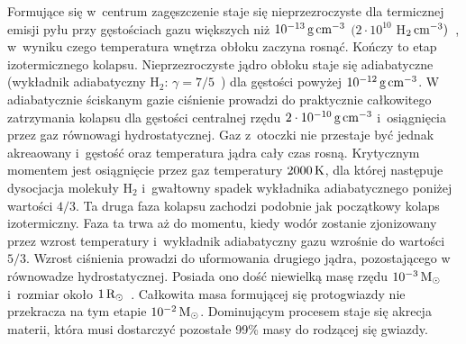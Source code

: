 \par Formujące się w~centrum zagęszczenie staje się nieprzezroczyste dla
termicznej emisji pyłu przy gęstościach gazu większych niż $10^{-13}\hbox{$\thinspace\textrm{g}$}\hbox{$\thinspace\textrm{cm}$}^{-3}$
$(2\cdot10^{10}$ H$_2\hbox{$\thinspace\textrm{cm}$}^{-3})$~\cite{L69}, w~wyniku czego temperatura wnętrza
obłoku zaczyna rosnąć. Kończy to etap izotermicznego kolapsu. Nieprzezroczyste
jądro obłoku staje się adiabatyczne (wykładnik adiabatyczny H$_2$: $\gamma =
7/5$~\cite{L69}) dla gęstości powyżej $10^{-12}\hbox{$\thinspace\textrm{g}$}\hbox{$\thinspace\textrm{cm}$}^{-3}$. W adiabatycznie
ściskanym gazie ciśnienie prowadzi do praktycznie
całkowitego zatrzymania kolapsu dla gęstości centralnej rzędu $2\cdot
10^{-10}\hbox{$\thinspace\textrm{g}$}\hbox{$\thinspace\textrm{cm}$}^{-3}$ i~osiągnięcia przez gaz równowagi hydrostatycznej. Gaz
z~otoczki nie przestaje być jednak akreaowany i~gęstość oraz temperatura jądra
cały czas rosną. Krytycznym momentem jest osiągnięcie przez gaz temperatury
$2000\hbox{$\thinspace\textrm{K}$}$, dla której następuje dysocjacja molekuły H$_2$ i~gwałtowny spadek
wykładnika adiabatycznego poniżej wartości $4/3$. Ta druga faza kolapsu zachodzi
podobnie jak początkowy kolaps izotermiczny. Faza ta trwa aż do momentu, kiedy
wodór zostanie zjonizowany przez wzrost temperatury i~wykładnik adiabatyczny
gazu wzrośnie do wartości $5/3$.  Wzrost ciśnienia prowadzi do uformowania
drugiego jądra, pozostającego w równowadze hydrostatycznej. Posiada ono dość
niewielką masę rzędu $10^{-3}\hbox{$\mathrm{\thinspace M_{\odot}}$}$ i~rozmiar około $1\hbox{$\mathrm{\thinspace R_{\odot}}$}$~\cite{MI00}.
Całkowita masa formującej się protogwiazdy nie przekracza na tym etapie
$10^{-2}\hbox{$\mathrm{\thinspace M_{\odot}}$}$.  Dominującym procesem staje się akrecja materii, która musi
dostarczyć pozostałe 99\% masy do rodzącej się gwiazdy. 

